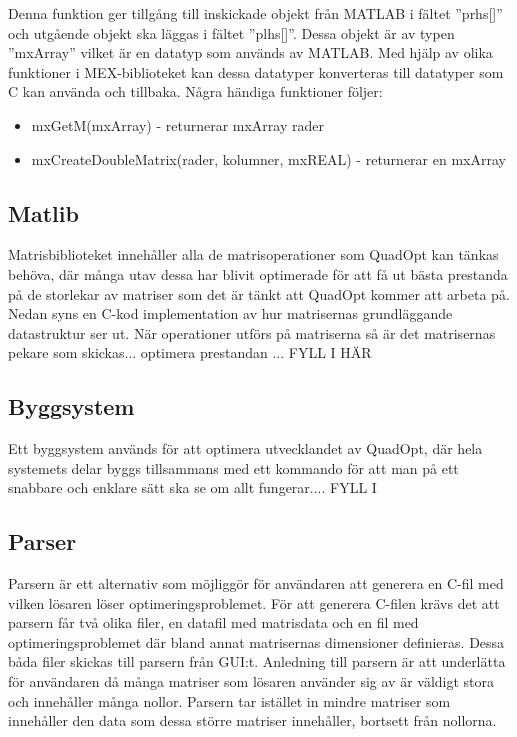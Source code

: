 Denna funktion ger tillgång till inskickade objekt från MATLAB i fältet ''prhs[]'' och utgående objekt ska läggas i fältet ''plhs[]''. Dessa objekt är av typen ''mxArray'' vilket är en datatyp som används av MATLAB. Med hjälp av olika funktioner i MEX-biblioteket kan dessa datatyper konverteras till datatyper som C kan använda och tillbaka. Några händiga funktioner följer:
\begin{itemize}
\item mxGetM(mxArray) - returnerar mxArray rader
\item mxCreateDoubleMatrix(rader, kolumner, mxREAL) - returnerar en mxArray
\end{itemize}



\subsection{Matlib}
Matrisbiblioteket innehåller alla de matrisoperationer som QuadOpt kan tänkas behöva, där många utav dessa har blivit optimerade för att få ut bästa prestanda på de storlekar av matriser som det är tänkt att QuadOpt kommer att arbeta på. Nedan syns en C-kod implementation av hur matrisernas grundläggande datastruktur ser ut. När operationer utförs på matriserna så är det matrisernas pekare som skickas... optimera prestandan ... FYLL I HÄR


\subsection{Byggsystem}
Ett byggsystem används för att optimera utvecklandet av QuadOpt, där hela systemets delar byggs tillsammans med ett kommando för att man på ett snabbare och enklare sätt ska se om allt fungerar....  FYLL I

\subsection{Parser}
Parsern är ett alternativ som möjliggör för användaren att generera en C-fil med vilken lösaren löser optimeringsproblemet. För att generera C-filen krävs det att parsern får två olika filer, en datafil med matrisdata och en fil med optimeringsproblemet där bland annat matrisernas dimensioner definieras. Dessa båda filer skickas till parsern från GUI:t. Anledning till parsern är att underlätta för användaren då många matriser som lösaren använder sig av är väldigt stora och innehåller många nollor. Parsern tar istället in mindre matriser som innehåller den data som dessa större matriser innehåller, bortsett från nollorna.